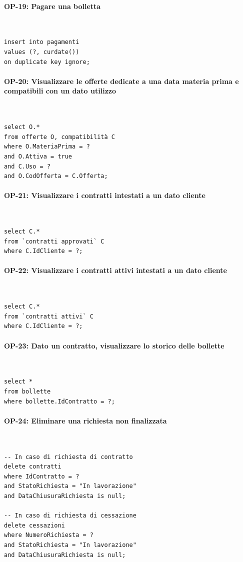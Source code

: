 \documentclass[a4paper,12pt]{report}
\begin{document}
\paragraph{OP-19: Pagare una bolletta}\mbox{}\\
\begin{lstlisting}
insert into pagamenti
values (?, curdate())
on duplicate key ignore;
\end{lstlisting}

\paragraph{OP-20: Visualizzare le offerte dedicate a una data materia prima e compatibili con un dato utilizzo}\mbox{}\\
\begin{lstlisting}
select O.*
from offerte O, compatibilità C
where O.MateriaPrima = ?
and O.Attiva = true
and C.Uso = ?
and O.CodOfferta = C.Offerta;
\end{lstlisting}

\paragraph{OP-21: Visualizzare i contratti intestati a un dato cliente}\mbox{}\\
\begin{lstlisting}
select C.*
from `contratti approvati` C
where C.IdCliente = ?;
\end{lstlisting}

\paragraph{OP-22: Visualizzare i contratti attivi intestati a un dato cliente}\mbox{}\\
\begin{lstlisting}
select C.*
from `contratti attivi` C
where C.IdCliente = ?;
\end{lstlisting}

\paragraph{OP-23: Dato un contratto, visualizzare lo storico delle bollette}\mbox{}\\
\begin{lstlisting}
select *
from bollette
where bollette.IdContratto = ?;
\end{lstlisting}

\paragraph{OP-24: Eliminare una richiesta non finalizzata}\mbox{}\\
\begin{lstlisting}
-- In caso di richiesta di contratto
delete contratti
where IdContratto = ?
and StatoRichiesta = "In lavorazione"
and DataChiusuraRichiesta is null;

-- In caso di richiesta di cessazione
delete cessazioni
where NumeroRichiesta = ?
and StatoRichiesta = "In lavorazione"
and DataChiusuraRichiesta is null;
\end{lstlisting}
\end{document}
